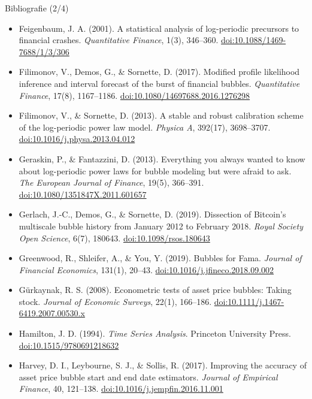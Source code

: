 \begin{frame}{Bibliografie (2/4)}
\itemsize{\tiny}
\begin{itemize}
    \item Feigenbaum, J. A. (2001). A statistical analysis of log-periodic precursors to financial crashes. \textit{Quantitative Finance}, 1(3), 346--360. \href{https://doi.org/10.1088/1469-7688/1/3/306}{doi:10.1088/1469-7688/1/3/306}
    \item Filimonov, V., Demos, G., \& Sornette, D. (2017). Modified profile likelihood inference and interval forecast of the burst of financial bubbles. \textit{Quantitative Finance}, 17(8), 1167--1186. \href{https://doi.org/10.1080/14697688.2016.1276298}{doi:10.1080/14697688.2016.1276298}
    \item Filimonov, V., \& Sornette, D. (2013). A stable and robust calibration scheme of the log-periodic power law model. \textit{Physica A}, 392(17), 3698--3707. \href{https://doi.org/10.1016/j.physa.2013.04.012}{doi:10.1016/j.physa.2013.04.012}
    \item Geraskin, P., \& Fantazzini, D. (2013). Everything you always wanted to know about log-periodic power laws for bubble modeling but were afraid to ask. \textit{The European Journal of Finance}, 19(5), 366--391. \href{https://doi.org/10.1080/1351847X.2011.601657}{doi:10.1080/1351847X.2011.601657}
    \item Gerlach, J.-C., Demos, G., \& Sornette, D. (2019). Dissection of Bitcoin\textquoteright s multiscale bubble history from January 2012 to February 2018. \textit{Royal Society Open Science}, 6(7), 180643. \href{https://doi.org/10.1098/rsos.180643}{doi:10.1098/rsos.180643}
    \item Greenwood, R., Shleifer, A., \& You, Y. (2019). Bubbles for Fama. \textit{Journal of Financial Economics}, 131(1), 20--43. \href{https://doi.org/10.1016/j.jfineco.2018.09.002}{doi:10.1016/j.jfineco.2018.09.002}
    \item Gürkaynak, R. S. (2008). Econometric tests of asset price bubbles: Taking stock. \textit{Journal of Economic Surveys}, 22(1), 166--186. \href{https://doi.org/10.1111/j.1467-6419.2007.00530.x}{doi:10.1111/j.1467-6419.2007.00530.x}
    \item Hamilton, J. D. (1994). \textit{Time Series Analysis}. Princeton University Press. \href{https://doi.org/10.1515/9780691218632}{doi:10.1515/9780691218632}
    \item Harvey, D. I., Leybourne, S. J., \& Sollis, R. (2017). Improving the accuracy of asset price bubble start and end date estimators. \textit{Journal of Empirical Finance}, 40, 121--138. \href{https://doi.org/10.1016/j.jempfin.2016.11.001}{doi:10.1016/j.jempfin.2016.11.001}

\end{itemize}
\end{frame}
